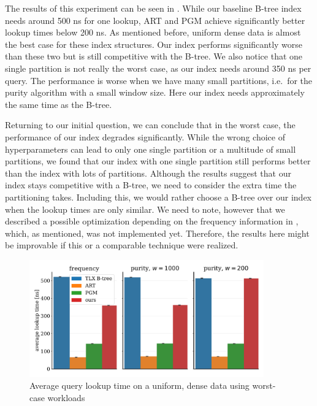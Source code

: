 The results of this experiment can be seen in . While our baseline B-tree index needs around 500 ns for one lookup, ART and PGM achieve significantly better lookup times below 200 ns. As mentioned before, uniform dense data is almost the best case for these index structures. Our index performs significantly worse than these two but is still competitive with the B-tree. We also notice that one single partition is not really the worst case, as our index needs around 350 ns per query. The performance is worse when we have many small partitions, i.e.~for the purity algorithm with a small window size. Here our index needs approximately the same time as the B-tree.

Returning to our initial question, we can conclude that in the worst case, the performance of our index degrades significantly. While the wrong choice of hyperparameters can lead to only one single partition or a multitude of small partitions, we found that our index with one single partition still performs better than the index with lots of partitions. Although the results suggest that our index stays competitive with a B-tree, we need to consider the extra time the partitioning takes. Including this, we would rather choose a B-tree over our index when the lookup times are only similar. We need to note, however that we described a possible optimization depending on the frequency information in , which, as mentioned, was not implemented yet. Therefore, the results here might be improvable if this or a comparable technique were realized. 


\begin{figure}
    \centering
    \includegraphics[width=0.9\textwidth]{figures/exp3_poc_times.pdf}
    \caption[Worst case lookup performance for partitioning]{Average query lookup time on a uniform, dense data using worst-case workloads}
    \label{fig:freqworsttimes}
\end{figure}

